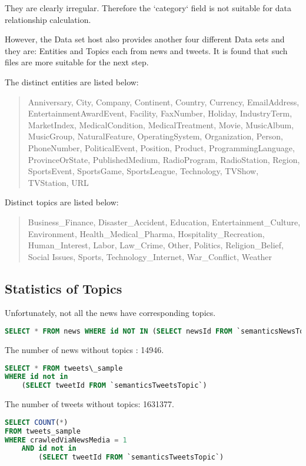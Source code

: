 They are clearly irregular. Therefore the `category` field is not suitable for data relationship calculation.

However, the Data set host also provides another four different Data sets and they are: Entities and Topics each from news and tweets. It is found that such files are more suitable for the next step.

The distinct entities are listed below:

\begin{quote}
Anniversary, City, Company, Continent, Country, Currency, EmailAddress, EntertainmentAwardEvent, Facility, FaxNumber, Holiday, IndustryTerm, MarketIndex, MedicalCondition, MedicalTreatment, Movie, MusicAlbum, MusicGroup, NaturalFeature, OperatingSystem, Organization, Person, PhoneNumber, PoliticalEvent, Position, Product, ProgrammingLanguage, ProvinceOrState, PublishedMedium, RadioProgram, RadioStation, Region, SportsEvent, SportsGame,  SportsLeague, Technology, TVShow, TVStation, URL
\end{quote}

Distinct topics are listed below:

\begin{quote}
Business\_Finance, Disaster\_Accident, Education, Entertainment\_Culture, Environment, Health\_Medical\_Pharma, Hospitality\_Recreation, Human\_Interest, Labor, Law\_Crime, Other, Politics, Religion\_Belief, Social Issues, Sports, Technology\_Internet, War\_Conflict, Weather
\end{quote}

\subsection{Statistics of Topics}
Unfortunately, not all the news have corresponding topics.

\begin{lstlisting}[language=SQL]
SELECT * FROM news WHERE id NOT IN (SELECT newsId FROM `semanticsNewsTopic`)
\end{lstlisting}

The number of news without topics : 14946.

\begin{lstlisting}[language=SQL]
SELECT * FROM tweets\_sample
WHERE id not in 
	(SELECT tweetId FROM `semanticsTweetsTopic`)
\end{lstlisting}

The number of tweets without topics: 1631377.

\begin{lstlisting}[language=SQL]
SELECT COUNT(*)
FROM tweets_sample 
WHERE crawledViaNewsMedia = 1 
	AND id not in 
		(SELECT tweetId FROM `semanticsTweetsTopic`)
\end{lstlisting}


